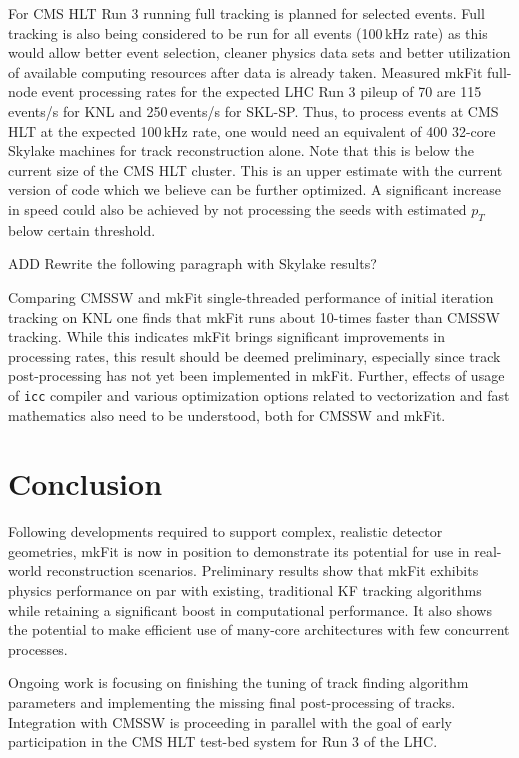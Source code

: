 \documentclass{webofc}
\def\mkfit{mkFit\xspace}
\def\stt#1{{\small\texttt{#1}}}
\begin{document}
For CMS HLT Run 3 running full tracking is planned for selected events. Full
tracking is also being considered to be run for all events (100\,kHz rate) as
this would allow better event selection, cleaner physics data sets and better
utilization of available computing resources after data is already taken.
Measured \mkfit full-node event processing rates for the expected LHC Run 3 pileup of 70
are 115\,events/s for KNL and 250\,events/s for SKL-SP. Thus, to process events
at CMS HLT at the expected 100\,kHz rate, one would need an equivalent of 400
32-core Skylake machines for track reconstruction alone. Note that this is below
the current size of the CMS HLT cluster. This is an upper
estimate with the current version of code which we believe can be further
optimized. A significant increase in speed could also be achieved by not
processing the seeds with estimated $p_T$ below certain threshold.

{ADD Rewrite the following paragraph with Skylake results?}

Comparing CMSSW and \mkfit single-threaded performance of initial iteration tracking
on KNL one finds that \mkfit runs about 10-times faster than CMSSW tracking.
While this indicates \mkfit brings
significant improvements in processing rates, this result should be deemed
preliminary, especially since track post-processing has not yet been
implemented in \mkfit. Further, effects of usage of \stt{icc} compiler and 
various optimization options related to vectorization and fast mathematics 
also need to be understood, both for CMSSW and \mkfit.


\section{Conclusion}

Following developments required to support complex, realistic detector
geometries, \mkfit is now in position to demonstrate its potential for use in
real-world reconstruction scenarios. Preliminary results show that \mkfit
exhibits physics performance on par with existing, traditional KF tracking
algorithms while retaining a significant boost in computational
performance. It also shows the potential to make efficient use of many-core
architectures with few concurrent processes.

Ongoing work is focusing on finishing the tuning of track finding algorithm
parameters and implementing the missing final post-processing of
tracks. Integration with CMSSW is proceeding in parallel with the goal of
early participation in the CMS HLT test-bed system for Run 3 of the LHC.
\end{document}

